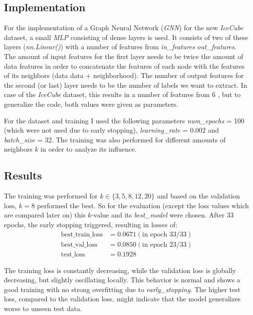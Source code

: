 

\setlength{\parindent}{0em}



\subsection{Implementation}
For the implementation of a Graph Neural Network (\textit{GNN}) for the new \textit{IceCube} dataset, a small \textit{MLP} consisting of dense layers is used.
It consists of two of these layers (\textit{nn.Linear()}) with a number of features from \textit{in\_features}  \rightarrow \textit{out\_features}.
The amount of input features for the first layer needs to be twice the amount of data features in order to concatenate the features of each node with the features of its neighbors (data \rightarrow data + neighborhood).
The number of output features for the second (or last) layer needs to be the number of labels we want to extract.
In case of the \textit{IceCube} dataset, this results in a number of features from 6  , but to generalize the code, both values were given as parameters.

For the dataset and training I used the following parameters \textit{num\_epochs} = 100 (which were not used due to early stopping), \textit{learning\_rate} = $0.002$ and \textit{batch\_size} = 32.
The training was also performed for different amounts of neighbors $k$ in order to analyze its influence.

\subsection{Results}
The training was performed for $k \in \{3, 5, 8, 12, 20\}$ and based on the validation loss, $k = 8$ performed the best. So for the evaluation (except the loss values which are compared later on) this $k$-value and its \textit{best\_model} were chosen.
After 33 epochs, the early stopping triggered, resulting in losses of:
\begin{align*}
  \text{best\_train\_loss} &= 0.0671 (\text{in epoch 33/33})\\
  \text{best\_val\_loss} &= 0.0850 (\text{in epoch 23/33})\\
  \text{test\_loss} &= 0.1928
\end{align*}

The training loss is constantly decreasing, while the validation loss is globally decreasing, but slightly oscillating locally. 
This behavior is normal and shows a good training with no strong overfitting due to \textit{early\_stopping}.
The higher test loss, compared to the validation loss, might indicate that the model generalizes worse to unseen test data.

